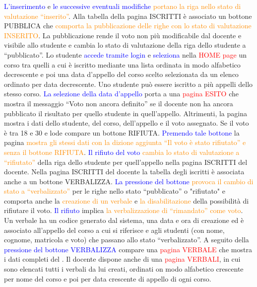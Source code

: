 \documentclass[a4paper,12pt]{scrreprt}
\newcommand{\ulgreen}[1]{\bgroup\markoverwith{\textcolor{green!60!black}{\rule[-0.5ex]{2pt}{0.4pt}}}\ULon{#1}\egroup}
\begin{document}
\textcolor{blue}{L’inserimento} e \textcolor{blue}{le successive eventuali modifiche} \textcolor{darkorange}{portano la riga nello stato di valutazione “inserito”}. Alla tabella
della pagina ISCRITTI è associato \textcolor{green!60!black}{un bottone PUBBLICA} che \textcolor{darkorange}{comporta la pubblicazione delle righe con lo stato di
valutazione INSERITO}. La pubblicazione rende il voto non più modificabile dal docente e visibile allo studente e
cambia lo stato di valutazione della riga dello studente a “pubblicato”. Lo studente \textcolor{blue}{accede tramite login} e \textcolor{blue}{seleziona}
nella \textcolor{red}{HOME page} \textcolor{green!60!black}{un corso tra quelli a cui è iscritto mediante una lista ordinata} in modo alfabetico decrescente e
\textcolor{green!60!black}{poi una data d’appello del corso scelto selezionata da un elenco ordinato} per data decrescente. Uno studente può
essere iscritto a più appelli dello stesso corso. \textcolor{blue}{La selezione della data d’appello} porta a una \textcolor{red}{pagina ESITO} che \textcolor{green!60!black}{mostra
il messaggio “Voto non ancora definito”} se il docente non ha ancora pubblicato il risultato per quello studente in
quell’appello. Altrimenti, la pagina \textcolor{green!60!black}{mostra i dati dello studente, del corso, dell’appello e il voto assegnato}. Se il voto
è tra 18 e 30 e lode compare \textcolor{green!60!black}{un bottone RIFIUTA}. \textcolor{blue}{Premendo tale bottone} la pagina \textcolor{darkorange}{mostra gli stessi dati con la
dizione aggiunta “Il voto è stato rifiutato” e senza il bottone RIFIUTA}. \textcolor{blue}{Il rifiuto del voto} \textcolor{darkorange}{cambia lo stato di valutazione
a “rifiutato”} della riga dello studente per quell’appello nella pagina ISCRITTI del docente. Nella pagina ISCRITTI del
docente la tabella degli iscritti è associata anche a \textcolor{green!60!black}{un bottone VERBALIZZA}. \textcolor{blue}{La pressione del bottone} \textcolor{darkorange}{provoca il
cambio di stato a “verbalizzato”} per le righe nello stato “pubblicato” o "rifiutato" e comporta anche la \textcolor{darkorange}{creazione di
un verbale} e \textcolor{darkorange}{la disabilitazione} della possibilità di rifiutare il voto. \textcolor{blue}{Il rifiuto} implica \textcolor{darkorange}{la verbalizzazione di “rimandato”
come voto}. Un verbale ha un codice generato dal sistema, una data e ora di creazione ed è associato all’appello del
corso a cui si riferisce e agli studenti (con nome, cognome, matricola e voto) che passano allo stato “verbalizzato”.
A seguito della \textcolor{blue}{pressione del bottone VERBALIZZA} compare una \textcolor{red}{pagina VERBALE} che \textcolor{green!60!black}{mostra i dati completi del}
\textcolor{darkorange}{\ulgreen{verbale creato}}. Il docente dispone anche di una \textcolor{red}{pagina VERBALI}, in cui \textcolor{green!60!black}{sono elencati tutti i verbali da lui creati},
ordinati on modo alfabetico crescente per nome del corso e poi per data crescente di appello di ogni corso.
\end{document}

